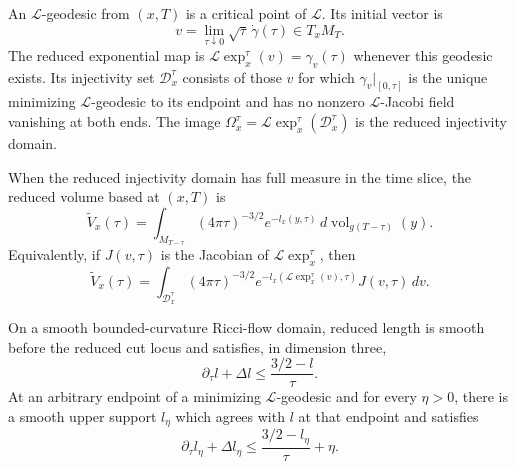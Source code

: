 \begin{definition}
\label{def:reduced-exponential-map}
\notready
An $\mathcal L$-geodesic from $(x,T)$ is a critical point of
$\mathcal L$.  Its initial vector is
\[
 v=\lim_{\tau\downarrow0}\sqrt\tau\,\dot\gamma(\tau)
 \in T_xM_T.
\]
The reduced exponential map is
$\mathcal L\exp_x^\tau(v)=\gamma_v(\tau)$ whenever this geodesic exists.
Its injectivity set $\mathcal D_x^\tau$ consists of those $v$ for which
$\gamma_v|_{[0,\tau]}$ is the unique minimizing $\mathcal L$-geodesic to its
endpoint and has no nonzero $\mathcal L$-Jacobi field vanishing at both ends.
The image $\Omega_x^\tau=\mathcal L\exp_x^\tau(\mathcal D_x^\tau)$ is the
reduced injectivity domain.
\end{definition}

\begin{definition}
\label{def:reduced-volume}
\notready
When the reduced injectivity domain has full measure in the time slice, the
reduced volume based at $(x,T)$ is
\[
 \widetilde V_x(\tau)=
 \int_{M_{T-\tau}}(4\pi\tau)^{-3/2}e^{-l_x(y,\tau)}
 \,d\operatorname{vol}_{g(T-\tau)}(y).
\]
Equivalently, if $J(v,\tau)$ is the Jacobian of
$\mathcal L\exp_x^\tau$, then
\[
 \widetilde V_x(\tau)=
 \int_{\mathcal D_x^\tau}(4\pi\tau)^{-3/2}
 e^{-l_x(\mathcal L\exp_x^\tau(v),\tau)}J(v,\tau)\,dv.
\]
\end{definition}

\begin{lemma}
\label{lem:reduced-length-support-inequality}
\notready
On a smooth bounded-curvature Ricci-flow domain, reduced length is smooth
before the reduced cut locus and satisfies, in dimension three,
\[
 \partial_\tau l+\Delta l\le \frac{3/2-l}{\tau}.
\]
At an arbitrary endpoint of a minimizing $\mathcal L$-geodesic and for every
$\eta>0$, there is a smooth upper support $l_\eta$ which agrees with $l$ at
that endpoint and satisfies
\[
 \partial_\tau l_\eta+\Delta l_\eta
 \le \frac{3/2-l_\eta}{\tau}+\eta.
\]
\end{lemma}

